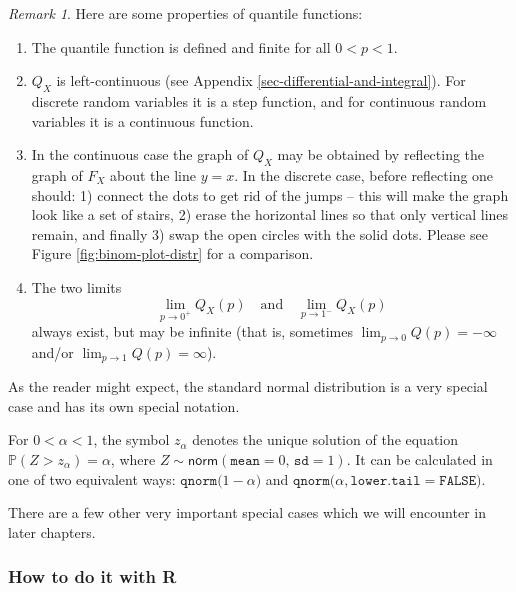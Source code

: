 \documentclass[]{book}
\providecommand{\tightlist}{%
  \setlength{\itemsep}{0pt}\setlength{\parskip}{0pt}}
\numberwithin{equation}{chapter}
\numberwithin{figure}{chapter}
\theoremstyle{plain}
\theoremstyle{definition}
\theoremstyle{remark}
\theoremstyle{definition}
\theoremstyle{definition}
\theoremstyle{remark}
\newtheorem*{remark}{Remark}
\let\BeginKnitrBlock\begin \let\EndKnitrBlock\end
\begin{document}
\begin{remark}
Here are some properties of quantile functions:

\begin{enumerate}
\def\labelenumi{\arabic{enumi}.}
\tightlist
\item
  The quantile function is defined and finite for all \(0<p<1\).
\item
  \(Q_{X}\) is left-continuous (see Appendix
  \ref{sec-differential-and-integral}). For discrete random variables it
  is a step function, and for continuous random variables it is a
  continuous function.
\item
  In the continuous case the graph of \(Q_{X}\) may be obtained by
  reflecting the graph of \(F_{X}\) about the line \(y=x\). In the
  discrete case, before reflecting one should: 1) connect the dots to
  get rid of the jumps -- this will make the graph look like a set of
  stairs, 2) erase the horizontal lines so that only vertical lines
  remain, and finally 3) swap the open circles with the solid dots.
  Please see Figure \ref{fig:binom-plot-distr} for a comparison.
\item
  The two limits \[ \lim_{p\to0^{+}}Q_{X}(p)\quad \mbox{and}\quad
     \lim_{p\to1^{-}}Q_{X}(p) \] always exist, but may be infinite (that
  is, sometimes \(\lim_{p\to0}Q(p)=-\infty\) and/or
  \(\lim_{p\to1}Q(p)=\infty\)).
\end{enumerate}
\end{remark}

As the reader might expect, the standard normal distribution is a very
special case and has its own special notation.

\bigskip

\BeginKnitrBlock{definition}
\protect\hypertarget{def:unnamed-chunk-271}{}{\label{def:unnamed-chunk-271}}For
\(0<\alpha<1\), the symbol \(z_{\alpha}\) denotes the unique solution of
the equation \(\mathbb{P} ( Z > z_{\alpha}) = \alpha\), where
\(Z \sim \mathsf{norm}(\mathtt{mean} = 0,\,\mathtt{sd} = 1)\). It can be
calculated in one of two equivalent ways:
\(\mathtt{qnorm(} 1 - \alpha \mathtt{)}\) and
\(\mathtt{qnorm(} \alpha \mathtt{, lower.tail = FALSE)}\).
\EndKnitrBlock{definition}

There are a few other very important special cases which we will
encounter in later chapters.

\subsubsection{How to do it with R}\label{how-to-do-it-with-r-25}
\end{document}
